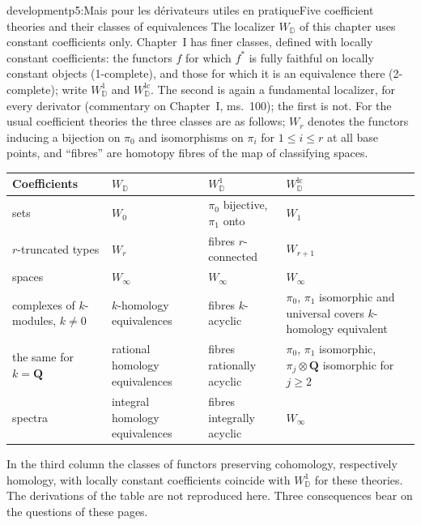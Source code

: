 \begin{dcomment}{development}{p5:Mais pour les dérivateurs utiles en pratique}{Five coefficient theories and their classes of equivalences}
The localizer $W_{\mathbb D}$ of this chapter uses constant coefficients only. Chapter~I has finer classes, defined with locally constant coefficients: the functors $f$ for which $f^*$ is fully faithful on locally constant objects (1-complete), and those for which it is an equivalence there (2-complete); write $W^1_{\mathbb D}$ and $W^{\mathrm{lc}}_{\mathbb D}$. The second is again a fundamental localizer, for every derivator (commentary on Chapter~I, ms.~100); the first is not. For the usual coefficient theories the three classes are as follows; $W_r$ denotes the functors inducing a bijection on $\pi_0$ and isomorphisms on $\pi_i$ for $1\leq i\leq r$ at all base points, and ``fibres'' are homotopy fibres of the map of classifying spaces.

\begin{center}
\small
\begin{tabular}{p{}p{}p{}p{}}
\hline
Coefficients & $W_{\mathbb D}$ & $W^1_{\mathbb D}$ & $W^{\mathrm{lc}}_{\mathbb D}$\\
\hline
sets & $W_0$ & $\pi_0$ bijective, $\pi_1$ onto & $W_1$\\
$r$-truncated types & $W_r$ & fibres $r$-connected & $W_{r+1}$\\
spaces & $W_\infty$ & $W_\infty$ & $W_\infty$\\
complexes of $k$-modules, $k\neq0$ & $k$-homology equivalences & fibres $k$-acyclic & $\pi_0$, $\pi_1$ isomorphic and universal covers $k$-homology equivalent\\
the same for $k=\mathbf Q$ & rational homology equivalences & fibres rationally acyclic & $\pi_0$, $\pi_1$ isomorphic, $\pi_j\otimes\mathbf Q$ isomorphic for $j\geq2$\\
spectra & integral homology equivalences & fibres integrally acyclic & $W_\infty$\\
\hline
\end{tabular}
\end{center}

In the third column the classes of functors preserving cohomology, respectively homology, with locally constant coefficients coincide with $W^1_{\mathbb D}$ for these theories. The derivations of the table are not reproduced here. Three consequences bear on the questions of these pages.


\end{dcomment}
